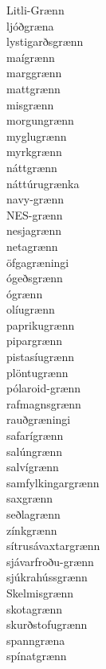 \documentclass[../samsetningasafn.tex]{subfiles}
\begin{document}
\begin{bigwordlist}
\begin{footnotesize}
\begin{multicols}{4}
\begin{description}
		\item [Litli-Grænn]
		\item [ljóðgræna]
		\item [lystigarðsgrænn]
		\item [maígrænn]
		\item [marggrænn]
		\item [mattgrænn]
		\item [misgrænn]
		\item [morgungrænn]
		\item [myglugrænn]
		\item [myrkgrænn]
		\item [náttgrænn]
		\item [náttúrugrænka]
		\item [navy-grænn]
		\item [NES-grænn]
		\item [nesjagrænn]
		\item [netagrænn]
		\item [öfgagræningi]
		\item [ógeðsgrænn]
		\item [ógrænn]
		\item [olíugrænn]
		\item [paprikugrænn]
		\item [pipargrænn]
		\item [pistasíugrænn]
		\item [plöntugrænn]
		\item [pólaroid-grænn]
		\item [rafmagnsgrænn]
		\item [rauðgræningi]
		\item [safarígrænn]
		\item [salúngrænn]
		\item [salvígrænn]
		\item [samfylkingargrænn]
		\item [saxgrænn]
		\item [seðlagrænn]
		\item [zínkgrænn]
		\item [sítrusávaxtargrænn]
		\item [sjávarfroðu-grænn]
		\item [sjúkrahússgrænn]
		\item [Skelmisgrænn]
		\item [skotagrænn]
		\item [skurðstofugrænn]
		\item [spanngræna]
		\item [spínatgrænn]

\end{description}
\end{multicols}
\end{footnotesize}
\end{bigwordlist}
\end{document}
